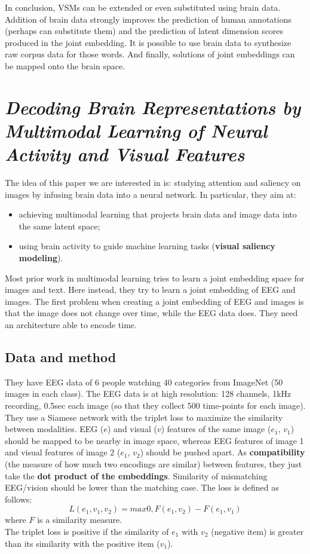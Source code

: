 In conclusion, VSMs can be extended or even substituted using brain data. Addition of brain data strongly improves the prediction of human annotations (perhaps can substitute them) and the prediction of latent dimension scores produced in the joint embedding. It is possible to use brain data to synthesize raw corpus data for those words. And finally, solutions of joint embeddings can be mapped onto the brain space.


\section[Decoding brain representations by multimodal learning of neural activity and visual features]{\textit{Decoding Brain Representations by Multimodal Learning of Neural Activity and Visual Features}\\ }

The idea of this paper we are interested in is: studying attention and saliency on images by infusing brain data into a neural network. In particular, they aim at:
\begin{itemize}
    \item achieving multimodal learning that projects brain data and image data into the same latent space;
    \item using brain activity to guide machine learning tasks (\textbf{visual saliency modeling}).
\end{itemize}

Most prior work in multimodal learning tries to learn a joint embedding space for images and text. Here instead, they try to learn a joint embedding of EEG and images.
The first problem when creating a joint embedding of EEG and images is that the image does not change over time, while the EEG data does. They need an architecture able to encode time.

\subsection{Data and method}
They have EEG data of 6 people watching 40 categories from ImageNet (50 images in each class). The EEG data is at high resolution: 128 channels, 1kHz recording, 0.5sec each image (so that they collect 500 time-points for each image).\\

They use a Siamese network with the triplet loss to maximize the similarity between modalities. EEG ($e$) and visual ($v$) features of the same image ($e_1$, $v_1$) should be mapped to be nearby in image space, whereas EEG features of image 1 and visual features of image 2 ($e_1$, $v_2$) should be pushed apart.
As \textbf{compatibility} (the measure of how much two encodings are similar) between features, they just take the \textbf{dot product of the embeddings}.
Similarity of mismatching EEG/vision should be lower than the matching case.
The loss is defined as follows:
\[
L(e_1, v_1, v_2) = max{0, F(e_1, v_2) - F(e_1, v_1)}
\]
where $F$ is a similarity measure.\\
The triplet loss is positive if the similarity of $e_1$ with $v_2$ (negative item) is greater than its similarity with the positive item ($v_1$).\\


